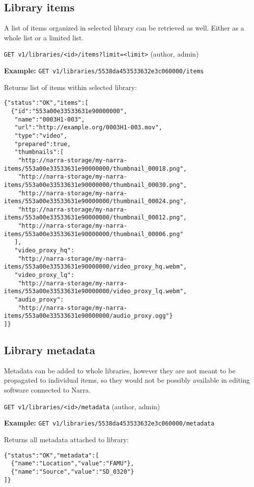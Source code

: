 \documentclass{book}
\newcommand{\request}[2]{{\color{blue}\texttt{#1} (#2)}}
\newcommand{\reqexample}[1]{{\color{blue}\textbf{Example:} \texttt{#1}}}
\begin{document}
\subsection{Library items}
A list of items organized in selected library can be retrieved as well. Either as a whole list or a limited list.

\request{GET v1/libraries/<id>/items?limit=<limit>}{author, admin}

\reqexample{GET v1/libraries/5538da453533632e3c060000/items}

Returns list of items within selected library:

\begin{verbatim}
{"status":"OK","items":[
  {"id":"553a00e33533631e90000000",
   "name":"0003H1-003",
   "url":"http://example.org/0003H1-003.mov",
   "type":"video",
   "prepared":true,
   "thumbnails":[
    "http://narra-storage/my-narra-items/553a00e33533631e90000000/thumbnail_00018.png",
    "http://narra-storage/my-narra-items/553a00e33533631e90000000/thumbnail_00030.png",
    "http://narra-storage/my-narra-items/553a00e33533631e90000000/thumbnail_00024.png",
    "http://narra-storage/my-narra-items/553a00e33533631e90000000/thumbnail_00012.png",
    "http://narra-storage/my-narra-items/553a00e33533631e90000000/thumbnail_00006.png"
   ],
   "video_proxy_hq":
    "http://narra-storage/my-narra-items/553a00e33533631e90000000/video_proxy_hq.webm",
   "video_proxy_lq":
    "http://narra-storage/my-narra-items/553a00e33533631e90000000/video_proxy_lq.webm",
   "audio_proxy":
    "http://narra-storage/my-narra-items/553a00e33533631e90000000/audio_proxy.ogg"}
]}
\end{verbatim}

\subsection{Library metadata}

Metadata can be added to whole libraries, however they are not meant to be propagated to individual items, so they would not be possibly available in editing software connected to Narra.

\request{GET v1/libraries/<id>/metadata}{author, admin}

\reqexample{GET v1/libraries/5538da453533632e3c060000/metadata}

Returns all metadata attached to library:

\begin{verbatim}
{"status":"OK","metadata":[
  {"name":"Location","value":"FAMU"},
  {"name":"Source","value":"SD_0320"}
]}
\end{verbatim}
\end{document}
